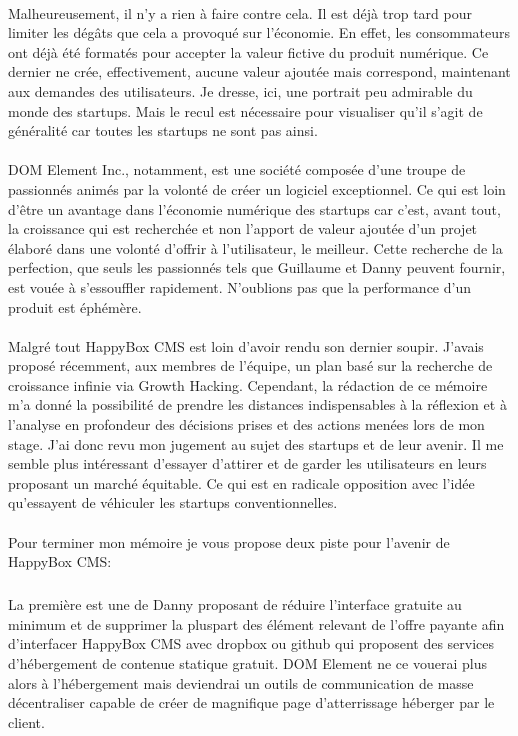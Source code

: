 \documentclass[11pt, a4paper ]{article}
\begin{document}
\begin{spacing}{1.5}
\paragraph{}
Malheureusement, il n'y a rien à faire contre cela. Il est déjà trop tard pour limiter les dégâts que cela a provoqué sur l'économie. En effet, les consommateurs ont déjà été formatés pour accepter la valeur fictive du produit numérique. Ce dernier ne crée, effectivement, aucune valeur ajoutée mais correspond, maintenant aux demandes des utilisateurs. Je dresse, ici, une portrait peu admirable du monde des  startups. Mais le recul est nécessaire pour visualiser qu'il s'agit de généralité car toutes les startups ne sont pas ainsi. 

\paragraph{}
DOM Element Inc., notamment, est une société composée d'une troupe de passionnés animés par la volonté de créer un logiciel exceptionnel. Ce qui est loin d'être un avantage dans l’économie numérique des startups car c'est, avant tout, la croissance qui est recherchée et non l'apport de valeur ajoutée d'un projet élaboré dans une volonté d'offrir à l'utilisateur, le meilleur.
 Cette recherche de la perfection, que seuls les passionnés tels que Guillaume et Danny peuvent fournir, est vouée à s’essouffler rapidement. N'oublions pas que la performance d'un produit est éphémère.

\paragraph{}
Malgré tout HappyBox CMS est loin d'avoir rendu son dernier soupir. J'avais proposé récemment, aux membres de l'équipe, un plan basé sur la recherche de croissance infinie via Growth Hacking. Cependant, la rédaction de ce mémoire m'a donné la possibilité de prendre les distances indispensables à la réflexion et à l'analyse en profondeur des décisions prises et des actions menées lors de mon stage. J'ai donc revu mon jugement au sujet des startups et de leur avenir.
Il me semble plus intéressant d'essayer d'attirer et de garder les utilisateurs en leurs proposant un marché équitable. Ce qui est en radicale opposition avec l'idée qu'essayent de véhiculer les startups conventionnelles.
\paragraph{}
Pour terminer mon mémoire je vous propose deux piste pour l'avenir de HappyBox CMS:
\subparagraph{}
La première est une de Danny proposant de réduire l'interface gratuite au minimum et de supprimer la pluspart des élément relevant de l'offre payante afin d'interfacer HappyBox CMS avec dropbox ou github qui proposent des services d'hébergement de contenue statique gratuit. DOM Element ne ce vouerai plus alors à l'hébergement mais deviendrai un outils de communication de masse décentraliser capable de créer de magnifique page d'atterrissage héberger par le client. 


\end{spacing}
\end{document}
